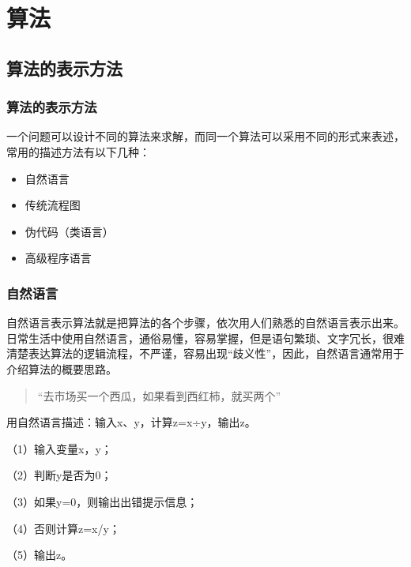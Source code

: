 \section{算法}


\subsection{算法的表示方法}

\begin{frame}
    \frametitle{算法的表示方法}
    一个问题可以设计不同的算法来求解，而同一个算法可以采用不同的形式来表述，常用的描述方法有以下几种：
    \begin{itemize}
      \item 自然语言
      \item 传统流程图
      \item 伪代码（类语言）
      \item 高级程序语言
    \end{itemize}
\end{frame}

\begin{frame}
    \frametitle{自然语言}
    自然语言表示算法就是把算法的各个步骤，依次用人们熟悉的自然语言表示出来。日常生活中使用自然语言，通俗易懂，容易掌握，但是语句繁琐、文字冗长，很难清楚表达算法的逻辑流程，不严谨，容易出现“歧义性”，因此，自然语言通常用于介绍算法的概要思路。
    
    \smallskip
    \begin{quote}
      “去市场买一个西瓜，如果看到西红柿，就买两个”
    \end{quote}

    \begin{block}{用自然语言描述：输入x、y，计算z=x÷y，输出z。}     

      （1）输入变量x，y；

      （2）判断y是否为0；

      （3）如果y=0，则输出出错提示信息；

      （4）否则计算z=x/y；

      （5）输出z。
    \end{block}
\end{frame}


